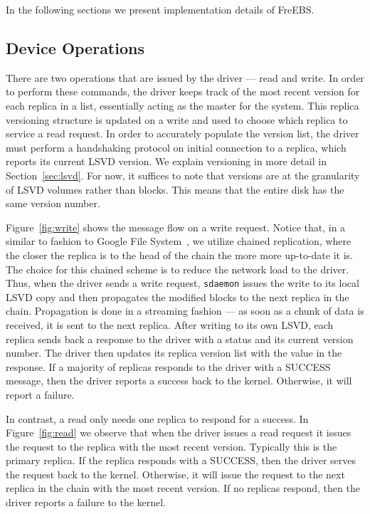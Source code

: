 In the following sections we present implementation details of FreEBS.

\subsection{Device Operations}
\label{sec:readwrite}
There are two operations that are issued by the driver --- read and write.
In order to perform these commands, the driver keeps track of the most 
recent version for each replica in a list, essentially acting as the master
for the system. This replica versioning structure is updated on a write and 
used to choose which replica to service a read request. In order to 
accurately populate the version list, the driver must perform a handshaking 
protocol on initial connection to a replica, which reports its current LSVD
version. We explain versioning in more detail in Section~\ref{sec:lsvd}. For 
now, it suffices to note that versions are at the granularity of LSVD
volumes rather than blocks. This means that the entire disk has the same 
version number. 

Figure~\ref{fig:write} shows the message flow on a write request. Notice
that, in a similar to fashion to Google File System~\cite{ghemawat2003google}, 
we utilize chained replication, where the closer the replica is to the 
head of the chain the more more up-to-date it is. The choice for this chained
scheme is to reduce the network load to the driver. Thus, when 
the driver sends a write request, \texttt{sdaemon} issues the write to its 
local LSVD copy and then propagates the modified blocks to the next replica 
in the chain. Propagation is done in a streaming fashion --- as soon as a 
chunk of data is received, it is sent to the next replica. After writing to 
its own LSVD, each replica sends back a 
response to the driver with a status and its current version number. The 
driver then updates its replica version list with the value in the response. 
If a majority of replicas responds to the driver with a SUCCESS message, 
then the driver reports a success back to the kernel. Otherwise, it will 
report a failure. 

In contrast, a read only needs one replica to respond for a success. In 
Figure~\ref{fig:read} we observe that when the driver issues a read request 
it issues the request to the replica with the most recent version. Typically 
this is the primary replica. If the replica responds with a SUCCESS, then 
the driver serves the request back to the kernel. Otherwise, it will issue 
the request to the next replica in the chain with the most recent version. 
If no replicas respond, then the driver reports a failure to the kernel.

